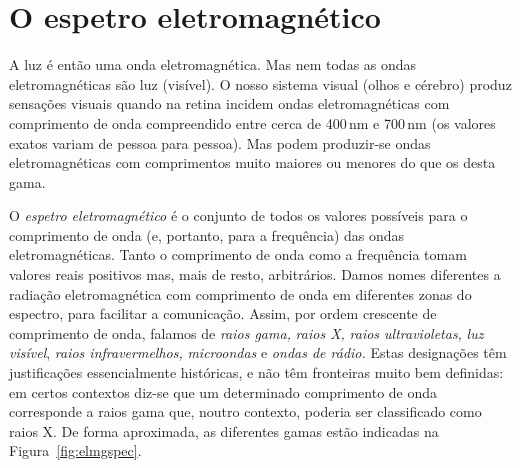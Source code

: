 \section{O espetro eletromagnético}
A luz é então uma onda eletromagnética. Mas nem todas as ondas eletromagnéticas
são luz (visível). O nosso sistema visual (olhos e cérebro) produz sensações
visuais quando na retina incidem ondas eletromagnéticas com comprimento de onda
compreendido entre cerca de 400\,nm e 700\,nm (os valores exatos variam de
pessoa para pessoa). Mas podem produzir-se ondas eletromagnéticas com
comprimentos muito maiores ou menores do que os desta gama.

O \emph{espetro eletromagnético} é o conjunto de todos os valores possíveis para
o comprimento de onda (e, portanto, para a frequência) das ondas
eletromagnéticas. Tanto o comprimento de onda como a frequência tomam valores
reais positivos mas, mais de resto, arbitrários. Damos nomes diferentes a
radiação eletromagnética com comprimento de onda em diferentes zonas do
espectro, para facilitar a comunicação. Assim, por ordem crescente de
comprimento de onda, falamos de \emph{raios gama,} \emph{raios X,}
\emph{raios ultravioletas,} \emph{luz visível}, \emph{raios infravermelhos,}
\emph{microondas} e \emph{ondas de rádio.} Estas designações têm justificações
essencialmente históricas, e não têm fronteiras muito bem definidas: em certos
contextos diz-se que um determinado comprimento de onda corresponde a raios gama
que, noutro contexto, poderia ser classificado como raios X. De forma
aproximada, as diferentes gamas estão indicadas na Figura~\ref{fig:elmgspec}.

